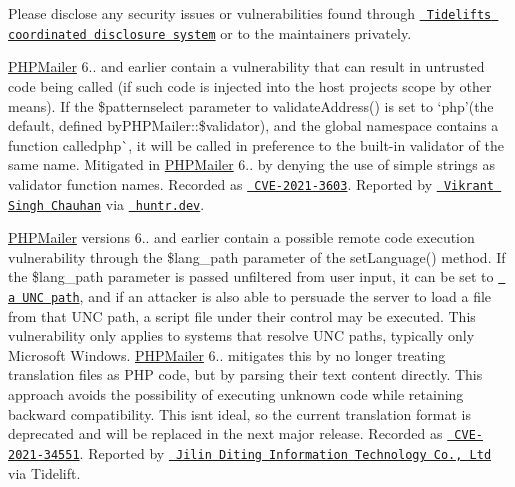 Please disclose any security issues or vulnerabilities found through \href{https://tidelift.com/security}{\texttt{ Tidelift\textquotesingle{}s coordinated disclosure system}} or to the maintainers privately.

\mbox{\hyperlink{namespace_p_h_p_mailer}{PHPMailer}} 6.. and earlier contain a vulnerability that can result in untrusted code being called (if such code is injected into the host project\textquotesingle{}s scope by other means). If the {\ttfamily \$patternselect} parameter to {\ttfamily validate\+Address()} is set to `\textquotesingle{}php'{\ttfamily (the default, defined by}PHPMailer\+::\$validator{\ttfamily ), and the global namespace contains a function called}php\`{}, it will be called in preference to the built-\/in validator of the same name. Mitigated in \mbox{\hyperlink{namespace_p_h_p_mailer}{PHPMailer}} 6.. by denying the use of simple strings as validator function names. Recorded as \href{https://web.nvd.nist.gov/view/vuln/detail?vulnId=CVE-2021-3603}{\texttt{ CVE-\/2021-\/3603}}. Reported by \href{mailto:vi@hackberry.xyz}{\texttt{ Vikrant Singh Chauhan}} via \href{https://www.huntr.dev/}{\texttt{ huntr.\+dev}}.

\mbox{\hyperlink{namespace_p_h_p_mailer}{PHPMailer}} versions 6.. and earlier contain a possible remote code execution vulnerability through the {\ttfamily \$lang\+\_\+path} parameter of the {\ttfamily set\+Language()} method. If the {\ttfamily \$lang\+\_\+path} parameter is passed unfiltered from user input, it can be set to \href{https://docs.microsoft.com/en-us/dotnet/standard/io/file-path-formats\#unc-paths}{\texttt{ a UNC path}}, and if an attacker is also able to persuade the server to load a file from that UNC path, a script file under their control may be executed. This vulnerability only applies to systems that resolve UNC paths, typically only Microsoft Windows. \mbox{\hyperlink{namespace_p_h_p_mailer}{PHPMailer}} 6.. mitigates this by no longer treating translation files as PHP code, but by parsing their text content directly. This approach avoids the possibility of executing unknown code while retaining backward compatibility. This isn\textquotesingle{}t ideal, so the current translation format is deprecated and will be replaced in the next major release. Recorded as \href{https://web.nvd.nist.gov/view/vuln/detail?vulnId=CVE-2021-34551}{\texttt{ CVE-\/2021-\/34551}}. Reported by \href{https://listensec.com}{\texttt{ Jilin Diting Information Technology Co., Ltd}} via Tidelift.

